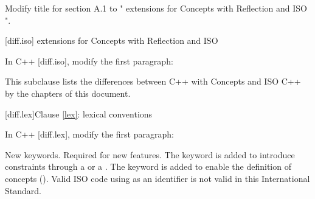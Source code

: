 \setcounter{chapter}{0}

Modify title for section A.1 to "\Cpp{} extensions for Concepts with Reflection
and ISO \CppXIV{}".

\setcounter{section}{0}
[diff.iso]{\Cpp{} extensions for Concepts with Reflection and ISO \CppXIV{}}

In C++ [diff.iso], modify the first paragraph:

\begin{std.txt}
This subclause lists the differences between C++ with  Concepts and ISO C++ by the chapters of this document.
\end{std.txt}

[diff.lex]{Clause \ref{lex}: lexical conventions}

In C++ [diff.lex], modify the first paragraph:

\begin{std.txt}
\change New keywords.
\rationale Required for new features.
The  keyword is added
to introduce constraints through a  or
a . The  keyword is
added to enable the definition of concepts ().
\effect
Valid ISO \CppXIV{} code using \added{,} 
as an identifier is not valid in this International Standard.
\end{std.txt}
